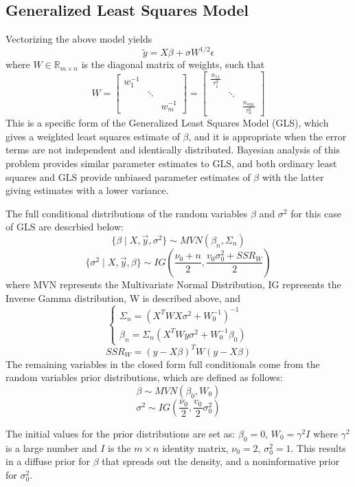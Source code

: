\documentclass[12pt,twoside]{dukestatscithesis}
\theoremstyle{definition}
\theoremstyle{definition}
\theoremstyle{definition}
\theoremstyle{remark}
\begin{document}
\subsection{Generalized Least Squares
Model}\label{generalized-least-squares-model}

Vectorizing the above model yields
\[\tilde{y} = X\beta + \sigma W^{1/2} \epsilon\] where
\(W \in \mathbb{R}_{m \times n}\) is the diagonal matrix of weights,
such that \[
  W =
  \begin{bmatrix}
    w^{-1}_{1} & & \\
    & \ddots & \\
    & & w^{-1}_{m}
  \end{bmatrix} 
  = \begin{bmatrix}
    \frac{n_{11}}{\tau_1^2} & & \\
    & \ddots & \\
    & & \frac{n_{mn}}{\tau_n^2}
  \end{bmatrix}\]
This is a specific form of the Generalized Least Squares Model (GLS),
which gives a weighted least squares estimate of \(\beta\), and it is
appropriate when the error terms are not independent and identically
distributed. Bayesian analysis of this problem provides similar
parameter estimates to GLS, and both ordinary least squares and GLS
provide unbiased parameter estimates of \(\beta\) with the latter giving
estimates with a lower variance.

The full conditional distributions of the random variables \(\beta\) and
\(\sigma^2\) for this case of GLS are descrbied below:
\[\{\beta \mid X, \vec{y}, \sigma^2\} \sim MVN (\beta_n, \Sigma_n)\]
\[\{\sigma^2 \mid X, \vec{y}, \beta\} \sim IG (\frac{\nu_0 + n}{2}, \frac{v_0\sigma^2_0 + SSR_W}{2})\]
where MVN represents the Multivariate Normal Distribution, IG represents
the Inverse Gamma distribution, W is described above, and
\[ \begin{cases}
      \Sigma_n = (X^TWX\sigma^2+W_0^{-1})^{-1}\\
      \beta_n = \Sigma_n(X^TWy\sigma^2 + W_0^{-1} \beta_0)
    \end{cases}\] \[SSR_W = (y - X\beta)^TW(y-X\beta)\]
The remaining variables in the closed form full conditionals come from
the random variables prior distributions, which are defined as follows:
\[\beta \sim MVN (\beta_0, W_0)\]
\[\sigma^2 \sim IG (\frac{\nu_0}{2}, \frac{v_0}{2}\sigma_0^2)\]

The initial values for the prior distributions are set as:
\(\beta_0 = 0\), \(W_0 = \gamma^2I\) where \(\gamma^2\) is a large
number and \(I\) is the \(m \times n\) identity matrix, \(\nu_0 = 2\),
\(\sigma_0^2 = 1\). This results in a diffuse prior for \(\beta\) that
spreads out the density, and a noninformative prior for \(\sigma^2_0\).
\end{document}
